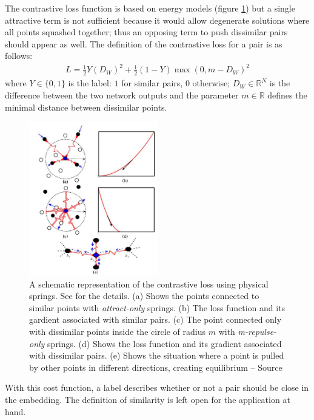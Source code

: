\documentclass[a4paper,12pt]{report}
\newcommand{\R}{\mathbb{R}}
\begin{document}
The contrastive loss function is based on energy models (figure \ref{fig:contrastive_spring}) but a single attractive term is not sufficient because it would allow degenerate solutions where all points squashed together; thus an opposing term to push dissimilar pairs should appear as well.
The definition of the contrastive loss for a pair is as follows:
\begin{eqnarray}
    L = \frac{1}{2} Y (D_W)^2 + \frac{1}{2} (1-Y) \max(0, m - D_W)^2
\end{eqnarray}
where $Y \in \{0,1\}$ is the label: $1$ for similar pairs, $0$ otherwise; $D_W \in \R^N$ is the difference between the two network outputs and the parameter $m \in \R$ defines the minimal distance between dissimilar points.

\begin{figure}[t]
    \begin{center}
        \includegraphics[width=0.5\textwidth]{thesis_figures/contrastive_spring.jpg}
    \end{center}
    \caption{A schematic representation of the contrastive loss using physical springs. See \cite{hadsell2006dimensionality} for the details. (a) Shows the points connected to similar points with {\em attract-only} springs. (b) The loss function and its gardient associated with similar pairs. (c) The point connected only with dissimilar points inside the circle of radius $m$ with {\em m-repulse-only} springs. (d) Shows the loss function and its gradient associated with dissimilar pairs. (e) Shows the situation where a point is pulled by other points in different directions, creating equilibrium -- Source \cite{hadsell2006dimensionality}}
    \label{fig:contrastive_spring}
\end{figure}

With this cost function, a label describes whether or not a pair should be close in the embedding.
The definition of similarity is left open for the application at hand.
\end{document}
